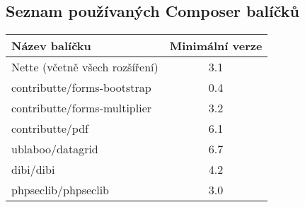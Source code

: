 \subsection*{Seznam používaných Composer balíčků}
\centering
	\begin{tabular}{lc}
		\textbf{Název balíčku}				& \textbf{Minimální verze} \\
		\hline
		Nette (včetně všech rozšíření)		& 3.1	\\
		contributte/forms-bootstrap			& 0.4	\\
		contributte/forms-multiplier			& 3.2	\\
		contributte/pdf						& 6.1	\\
		ublaboo/datagrid						& 6.7	\\
		dibi/dibi							& 4.2	\\
		phpseclib/phpseclib					& 3.0	\\
		
	\end{tabular}
